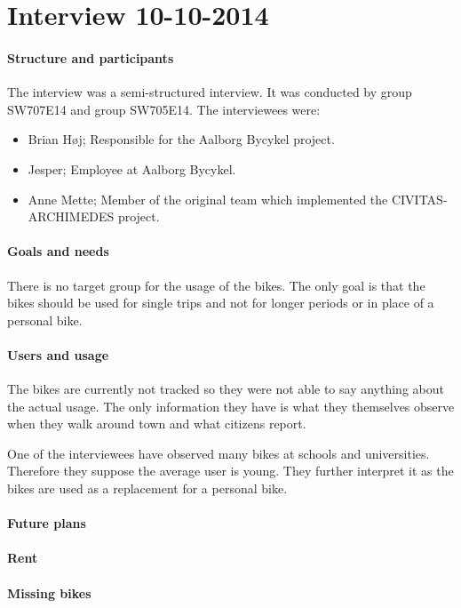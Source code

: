 \section{Interview 10-10-2014}
\paragraph{Structure and participants}
The interview was a semi-structured interview. 
It was conducted by group SW707E14 and group SW705E14.
The interviewees were:
\begin{itemize}
\item Brian Høj; Responsible for the Aalborg Bycykel project.
\item Jesper; Employee at Aalborg Bycykel.
\item Anne Mette; Member of the original team which implemented the CIVITAS-ARCHIMEDES project.
\end{itemize}


\paragraph{Goals and needs}
There is no target group for the usage of the bikes.
The only goal is that the bikes should be used for single trips and not for longer periods or in place of a personal bike.


\paragraph{Users and usage}
The bikes are currently not tracked so they were not able to say anything about the actual usage.
The only information they have is what they themselves observe when they walk around town and what citizens report.

One of the interviewees have observed many bikes at schools and universities.
Therefore they suppose the average user is young.
They further interpret it as the bikes are used as a replacement for a personal bike.


\paragraph{Future plans}


\paragraph{Rent}


\paragraph{Missing bikes}